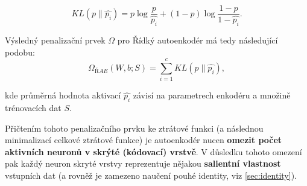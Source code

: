 \begin{equation}
    KL(p \parallel \hat{p_i}) = p \log \frac{p}{\hat{p_i}} + (1 - p) \log \frac{1 - p}{1 - \hat{p_i}}.
\end{equation}

Výsledný penalizační prvek $\Omega$ pro Řídký autoenkodér má tedy následující podobu:
\begin{equation}
    \Omega_{ŘAE}(W, b; S) = \sum_{i=1}^{c}KL(p \parallel \hat{p_i}),
\end{equation}

kde průměrná hodnota aktivací $\hat{p_i}$ závisí na parametrech enkodéru a množině trénovacích dat $S$. \cite{Charte2018}

Přičtením tohoto penalizačního prvku ke ztrátové funkci (a následnou minimalizací celkové ztrátové funkce) je autoenkodér nucen \textbf{omezit počet aktivních neuronů v skrýté (kódovací) vrstvě}.
V důsledku tohoto omezení pak každý neuron skryté vrstvy reprezentuje nějakou \textbf{salientní vlastnost} vstupních dat (a rovněž je zamezeno naučení pouhé identity, viz \autoref{sec:identity}). \cite{Goodfellow2016}
